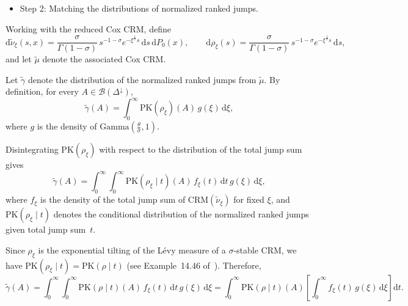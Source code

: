 \begin{itemize}
    \item Step 2: Matching the distributions of normalized ranked jumps.
\end{itemize}

Working with the reduced Cox CRM, define
\[
\mathrm{d}\tilde{\nu}_{\xi}(s,x) = \frac{\sigma}{\Gamma(1-\sigma)}\,s^{-1-\sigma}e^{-\xi^{\frac{1}{\sigma}}s}\,\mathrm{d}s\, \mathrm{d}P_0(x), \qquad
\mathrm{d}\rho_\xi(s) = \frac{\sigma}{\Gamma(1-\sigma)}\,s^{-1-\sigma}e^{-\xi^{\frac{1}{\sigma}}s}\,\mathrm{d}s,
\]
and let $\tilde{\mu}$ denote the associated Cox CRM.

Let $\tilde{\gamma}$ denote the distribution of the normalized ranked jumps from $\tilde{\mu}$. By definition, for every $A \in \mathcal{B}(\Delta^\downarrow)$,
\[
\tilde{\gamma}(A) = \int_0^\infty \mathrm{PK}(\rho_\xi)(A)\, g(\xi)\,\mathrm{d}\xi,
\]
where $g$ is the density of $\mathrm{Gamma}\!\left(\frac{\theta}{\sigma},1\right)$.

Disintegrating $\mathrm{PK}(\rho_\xi)$ with respect to the distribution of the total jump sum gives
\[
\tilde{\gamma}(A) = \int_0^\infty \int_0^\infty \mathrm{PK}(\rho_\xi \mid t)(A)\, f_{\xi}(t)\,\mathrm{d}t\, g(\xi)\,\mathrm{d}\xi,
\]
where $f_{\xi}$ is the density of the total jump sum of $\mathrm{CRM}(\tilde{\nu}_{\xi})$ for fixed $\xi$, and $\mathrm{PK}(\rho_\xi \mid t)$ denotes the conditional distribution of the normalized ranked jumps given total jump sum~$t$.

Since $\rho_\xi$ is the exponential tilting of the L\'evy measure of a $\sigma$-stable CRM, we have $\mathrm{PK}(\rho_\xi \mid t) = \mathrm{PK}(\rho \mid t)$ (see Example~14.46 of~\cite{ghosal2017fundamentals}). Therefore,
\[
\tilde{\gamma}(A) = \int_0^\infty \int_0^\infty \mathrm{PK}(\rho \mid t)(A)\, f_{\xi}(t)\,\mathrm{d}t\, g(\xi)\,\mathrm{d}\xi
= \int_0^\infty \mathrm{PK}(\rho \mid t)(A) \left[\int_0^\infty f_{\xi}(t)\, g(\xi)\,\mathrm{d}\xi\right]\mathrm{d}t.
\]

